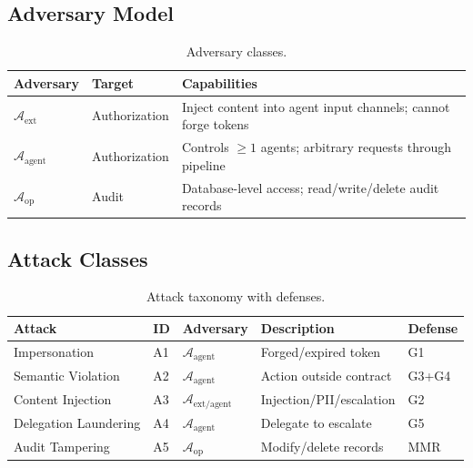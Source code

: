 \documentclass[11pt,a4paper]{article}
\begin{document}
\subsection{Adversary Model}

\begin{table}[ht]
\centering
\caption{Adversary classes.}
\label{tab:adversary}
\begin{tabular}{@{}lll@{}}
\toprule
\textbf{Adversary} & \textbf{Target} & \textbf{Capabilities} \\
\midrule
$\mathcal{A}_{\mathrm{ext}}$   & Authorization & Inject content into agent input channels; cannot forge tokens \\
$\mathcal{A}_{\mathrm{agent}}$ & Authorization & Controls $\geq 1$ agents; arbitrary requests through pipeline \\
$\mathcal{A}_{\mathrm{op}}$    & Audit         & Database-level access; read/write/delete audit records \\
\bottomrule
\end{tabular}
\end{table}

\subsection{Attack Classes}

\begin{table}[ht]
\centering
\caption{Attack taxonomy with defenses.}
\label{tab:attacks}
\begin{tabular}{@{}lllll@{}}
\toprule
\textbf{Attack} & \textbf{ID} & \textbf{Adversary} & \textbf{Description} & \textbf{Defense} \\
\midrule
Impersonation         & A1 & $\mathcal{A}_{\mathrm{agent}}$ & Forged/expired token              & G1 \\
Semantic Violation    & A2 & $\mathcal{A}_{\mathrm{agent}}$ & Action outside contract           & G3+G4 \\
Content Injection     & A3 & $\mathcal{A}_{\mathrm{ext/agent}}$ & Injection/PII/escalation      & G2 \\
Delegation Laundering & A4 & $\mathcal{A}_{\mathrm{agent}}$ & Delegate to escalate              & G5 \\
Audit Tampering       & A5 & $\mathcal{A}_{\mathrm{op}}$    & Modify/delete records             & MMR~\cite{licitrammr} \\
\bottomrule
\end{tabular}
\end{table}
\end{document}
